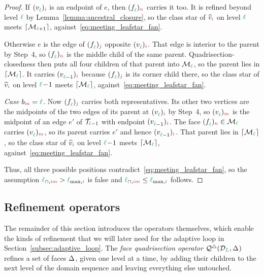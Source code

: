 \documentclass[a4paper, 12pt]{article}
\makeatletter
\newcommand{\quadriF}{\mathcal{Q}^{\triangle}}                   %
\newcommand{\lmaxIdx}[1]{\l_{\max,#1}}
\newcommand{\lmeetIdx}[2]{\l_{\cap,#1#2}}
\newcommand{\green}{\color{ForestGreen}}
\newcommand{\brickred}{\color{BrickRed}}
\newcommand{\T}{\mathcal{T}}
\DeclareRobustCommand{\simplexsubsetTwo}[2][]{\Delta\ifx\@empty#1\@empty\else^{#1}\fi_{#2}}
\newcommand{\vertex}[2]{\freeQ{v}{}{#1}{#2}}
\newcommand{\vertexClass}[1]{\widehat{v}_{#1}}
\newcommand{\face}[2]{\freeQ{f}{}{#1}{#2}}
\newcommand{\coarseIdxone}{{\brickred i}}
\newcommand{\coarseIdxtwo}{{\brickred m}}
\newcommand{\fineIdxone}{{\brickred j}}
\newcommand{\fineIdxtwo}{{\brickred n}}
\renewcommand{\l}{{\green\ell}}
\renewcommand{\L}{{\green L}}
\newcommand{\freeQ}[4]{ ( {#1}^{#2}_{#3} )_{#4}}
\newcommand{\M}{\mathcal{M}}
\theoremstyle{definition}
\theoremstyle{plain}
\numberwithin{equation}{section}
\newcommand{\ancestorPatch}[1]{\lceil #1 \rceil}
\DeclareRobustCommand{\domseq}[1][]{\mathcal{D}\ifx\@empty#1\@empty\else_{#1}\fi}
\makeatother
\begin{document}
\begin{proof}
    If $\vertex{\l}{\coarseIdxone}$ is an endpoint of $e$, then $\face{\l}{\fineIdxtwo}$ carries it too. It is refined beyond level $\l$ by Lemma~\ref{lemma:ancestral_closure}, so the class star of $\vertexClass{\coarseIdxone}$ on level $\l$ meets $\ancestorPatch{\M_{\l+1}}$, against~\eqref{eq:meeting_leafstar_fan}.

    Otherwise $e$ is the edge of $\face{\l}{\fineIdxone}$ opposite $\vertex{\l}{\coarseIdxone}$. That edge is interior to the parent by Step~4, so $\face{\l}{\fineIdxtwo}$ is the middle child of the same parent. Quadrisection-closedness then puts all four children of that parent into $\M_\l$, so the parent lies in $\ancestorPatch{\M_\l}$. It carries $\vertex{\l-1}{\coarseIdxone}$ because $\face{\l}{\fineIdxone}$ is its corner child there, so the class star of $\vertexClass{\coarseIdxone}$ on level $\l \! - \! 1$ meets $\ancestorPatch{\M_\l}$, against~\eqref{eq:meeting_leafstar_fan}.

    \emph{Case $b_\coarseIdxtwo = \l$.} Now $\face{\l}{\fineIdxone}$ carries both representatives. Its other two vertices are the midpoints of the two edges of its parent at $\vertex{\l}{\coarseIdxone}$ by Step~4, so $\vertex{\l}{\coarseIdxtwo}$ is the midpoint of an edge $e'$ of $\T_{\l-1}$ with endpoint $\vertex{\l-1}{\coarseIdxone}$. The face $\face{\l}{\fineIdxtwo} \in \M_\l$ carries $\vertex{\l}{\coarseIdxtwo}$, so its parent carries $e'$ and hence $\vertex{\l-1}{\coarseIdxone}$. That parent lies in $\ancestorPatch{\M_\l}$, so the class star of $\vertexClass{\coarseIdxone}$ on level $\l \! - \! 1$ meets $\ancestorPatch{\M_\l}$, against~\eqref{eq:meeting_leafstar_fan}.

    Thus, all three possible positions contradict~\eqref{eq:meeting_leafstar_fan}, so the assumption $\lmeetIdx{\coarseIdxone}{\coarseIdxtwo} > \lmaxIdx{\coarseIdxone}$ is false and $\lmeetIdx{\coarseIdxone}{\coarseIdxtwo} \leq \lmaxIdx{\coarseIdxone}$ follows.
\end{proof}

\subsection{Refinement operators}
\label{subsec:refinement_operators}
\label{subsec:operations_on_coverings}

The remainder of this section introduces the operators themselves, which enable the kinds of refinement that we will later need for the adaptive loop in Section~\ref{subsec:adaptive_loop}. The \emph{face quadrisection operator} $\quadriF(\domseq[\L], \simplexsubsetTwo{})$ refines a set of faces $\simplexsubsetTwo{}$, given one level at a time, by adding their children to the next level of the domain sequence and leaving everything else untouched.
\end{document}
